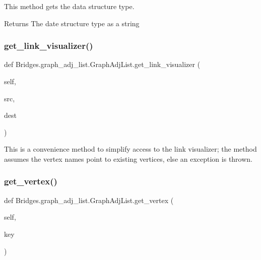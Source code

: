 This method gets the data structure type. 

\begin{DoxyReturn}{Returns}
The date structure type as a string 
\end{DoxyReturn}
\mbox{\label{class_bridges_1_1graph__adj__list_1_1_graph_adj_list_a80a3cacf989d047e20d4ccc83fa550f5}} 
\subsubsection{\texorpdfstring{get\+\_\+link\+\_\+visualizer()}{get\_link\_visualizer()}}
{\footnotesize\ttfamily def Bridges.\+graph\+\_\+adj\+\_\+list.\+Graph\+Adj\+List.\+get\+\_\+link\+\_\+visualizer (\begin{DoxyParamCaption}\item[{}]{self,  }\item[{}]{src,  }\item[{}]{dest }\end{DoxyParamCaption})}



This is a convenience method to simplify access to the link visualizer; the method assumes the vertex names point to existing vertices, else an exception is thrown. 

\mbox{\label{class_bridges_1_1graph__adj__list_1_1_graph_adj_list_a75a7ac26f72d773b40cd5eaa95d18b7a}} 
\subsubsection{\texorpdfstring{get\+\_\+vertex()}{get\_vertex()}}
{\footnotesize\ttfamily def Bridges.\+graph\+\_\+adj\+\_\+list.\+Graph\+Adj\+List.\+get\+\_\+vertex (\begin{DoxyParamCaption}\item[{}]{self,  }\item[{}]{key }\end{DoxyParamCaption})}



